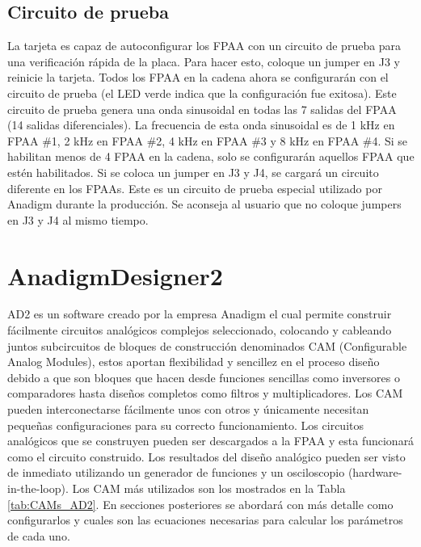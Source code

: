 		\subsection{Circuito de prueba}

	La tarjeta es capaz de autoconfigurar los FPAA con un circuito de prueba para una verificación rápida de la placa. Para hacer esto, coloque un jumper en J3 y reinicie la tarjeta. Todos los FPAA en la cadena ahora se configurarán con el circuito de prueba (el LED verde indica que la configuración fue exitosa). Este circuito de prueba genera una onda sinusoidal en todas las 7 salidas del FPAA (14 salidas diferenciales). La frecuencia de esta onda sinusoidal es de 1 kHz en FPAA \#{}1, 2 kHz en FPAA \#{}2, 4 kHz en FPAA \#{}3 y 8 kHz en FPAA \#{}4. Si se habilitan menos de 4 FPAA en la cadena, solo se configurarán aquellos FPAA que estén habilitados. Si se coloca un jumper en J3 y J4, se cargará un circuito diferente en los FPAAs. Este es un circuito de prueba especial utilizado por Anadigm durante la producción. Se aconseja al usuario que no coloque jumpers en J3 y J4 al mismo tiempo.

	\section{AnadigmDesigner2}
	
	AD2 es un software creado por la empresa Anadigm el cual permite construir fácilmente circuitos analógicos complejos seleccionado, colocando y cableando juntos subcircuitos de bloques de construcción  denominados CAM (Configurable Analog Modules), estos aportan flexibilidad y sencillez en el proceso diseño debido a que son bloques que hacen desde funciones sencillas como inversores o comparadores hasta diseños completos como filtros y multiplicadores. Los CAM pueden interconectarse fácilmente unos con otros y únicamente necesitan pequeñas configuraciones para su correcto funcionamiento. Los circuitos analógicos que se construyen pueden ser descargados a la FPAA y esta funcionará como el circuito construido. Los resultados del diseño analógico pueden ser visto de inmediato utilizando un generador de funciones y un osciloscopio (hardware-in-the-loop). Los CAM más utilizados son los mostrados en la Tabla \ref{tab:CAMs_AD2}. En secciones posteriores se abordará con más detalle como configurarlos y cuales son las ecuaciones necesarias para calcular los parámetros de cada uno.  
	
